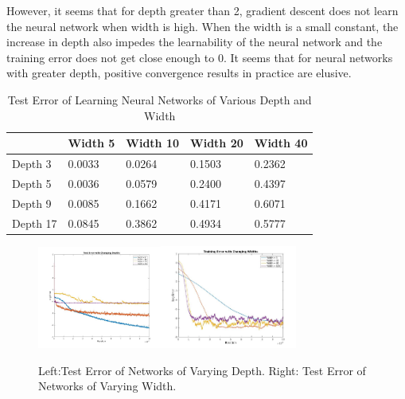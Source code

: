 \documentclass{article}
\begin{document}
However, it seems that for depth greater than 2, gradient descent does not learn the neural network when width is high. When the width is a small constant, the increase in depth also impedes the learnability of the neural network and the training error does not get close enough to 0. It seems that for neural networks with greater depth, positive convergence results in practice are elusive.
\begin{table}[tb]
\caption{Test Error of Learning Neural Networks of Various Depth and Width}
\vskip 0.1in
\begin{center}
\begin{small}
\begin{sc}
\begin{tabular}{
  |p{}|%
  |p{}%
  |p{}%
  |p{}%
   |p{}|%
  }
   \hline 
           & Width 5   &  Width 10   & Width 20 & Width 40     \\ \hline 
    Depth 3 & 0.0033   & 0.0264        &   0.1503 & 0.2362 \\ \hline
    Depth 5 & 0.0036   & 0.0579        &   0.2400 & 0.4397 \\ \hline
    Depth 9 & 0.0085   & 0.1662        &   0.4171 & 0.6071 \\ \hline
    Depth 17 & 0.0845   & 0.3862        &   0.4934 & 0.5777 \\ \hline
\end{tabular}
\end{sc}
\end{small}
\end{center}
\vskip -0.1in
\end{table}
\begin{figure}[tb]
\vskip 0.1in
\begin{center}
\includegraphics[width = 1.6in]{plotChangeDepth.jpg}\includegraphics[width = 1.77in]{plotChangeWidth.jpg}
\caption{Left:Test Error of Networks of Varying Depth. Right: Test Error of Networks of Varying Width.}
\end{center}
\vskip -0.1in
\end{figure}
\end{document}
